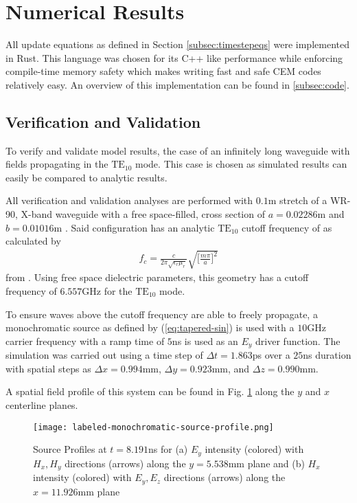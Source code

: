 \section{Numerical Results}
\label{sec:numres} 
All update equations as defined in Section \ref{subsec:timestepeqs} were implemented in Rust. This language was chosen for its C++ like performance while enforcing compile-time memory safety which makes writing fast and safe CEM codes relatively easy. An overview of this implementation can be found in \ref{subsec:code}.

\subsection{Verification and Validation}
\label{subsec:vv}
To verify and validate model results, the case of an infinitely long waveguide with fields propagating in the $\mathrm{TE_{10}}$ mode. This case is chosen as simulated results can easily be compared to analytic results.

All verification and validation analyses are performed with $0.1$m stretch of a WR-90, X-band waveguide with a free space-filled, cross section of $a=0.02286$m and $b=0.01016$m \cite{everythingrf}. Said configuration has an analytic $\mathrm{TE_{10}}$ cutoff frequency of as calculated by
\begin{align}
    f_c=\frac{c}{2\pi\sqrt{\epsilon_r\mu_r}}\sqrt{\bigg[\frac{m\pi}{a}\bigg]^2}
    \label{eq:analytic-cutoff}
\end{align}
from \cite{pozar2011microwave}. Using free space dielectric parameters, this geometry has a cutoff frequency of $6.557$GHz for the $\mathrm{TE_{10}}$ mode.

To ensure waves above the cutoff frequency are able to freely propagate, a monochromatic source as defined by (\ref{eq:tapered-sin}) is used with a $10$GHz carrier frequency with a ramp time of $5$ns is used as an $E_y$ driver function. The simulation was carried out using a time step of $\Delta t=1.863$ps over a $25$ns duration with spatial steps as $\Delta x=0.994$mm, $\Delta y=0.923$mm, and $\Delta z=0.990$mm.

A spatial field profile of this system can be found in Fig. \ref{fig:profile} along the $y$ and $x$ centerline planes.

\begin{figure}[h!]  
	\centering
	\texttt{[image: labeled-monochromatic-source-profile.png]} 
	\caption{Source Profiles at $t=8.191$ns for (a) $E_y$ intensity (colored) with $H_x, H_y$ directions (arrows) along the $y=5.538$mm plane and (b) $H_x$ intensity (colored) with $E_y, E_z$ directions (arrows) along the $x=11.926$mm plane}
	\label{fig:profile}
\end{figure}

